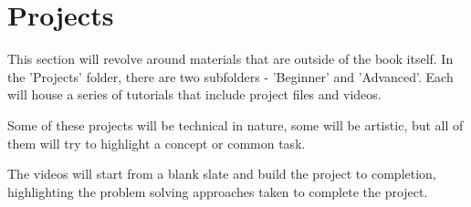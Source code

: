\cleardoublepage
\chapter{Projects}
\label{ch:13}


\begin{fullwidth}

This section will revolve around materials that are outside of the book itself. In the 'Projects' folder, there are two subfolders - 'Beginner' and 'Advanced'. Each will house a series of tutorials that include project files and videos. 

Some of these projects will be technical in nature, some will be artistic, but all of them will try to highlight a concept or common task.

The videos will start from a blank slate and build the project to completion, highlighting the problem solving approaches taken to complete the project.

\end{fullwidth}


